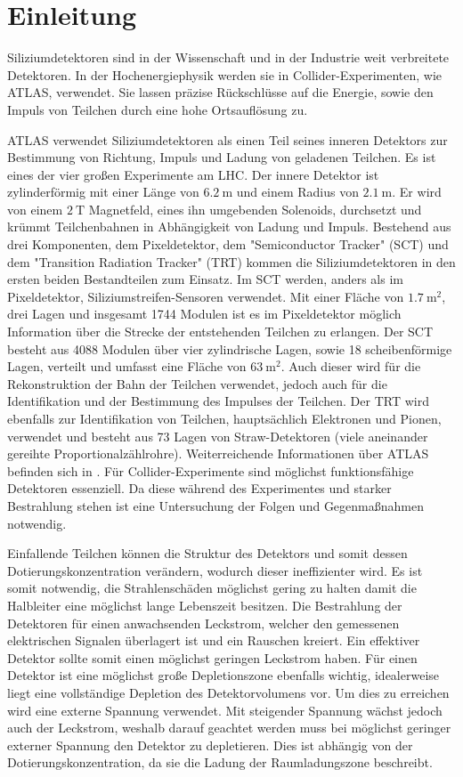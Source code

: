 \chapter{Einleitung}
Siliziumdetektoren sind in der Wissenschaft und in der Industrie weit verbreitete
Detektoren. In der Hochenergiephysik werden sie in Collider-Experimenten, wie ATLAS, verwendet.
Sie  lassen präzise Rückschlüsse auf die Energie, sowie den Impuls von Teilchen durch eine
hohe Ortsauflösung zu.


ATLAS verwendet Siliziumdetektoren als
einen Teil seines inneren Detektors zur Bestimmung von Richtung, Impuls
und Ladung von geladenen Teilchen. Es ist eines der vier großen Experimente am LHC.
Der innere Detektor ist zylinderförmig mit einer Länge von $\SI{6.2}{\meter}$ und
einem Radius von $\SI{2.1}{\meter}$. Er wird von einem $\SI{2}{\tesla}$ Magnetfeld, eines ihn umgebenden Solenoids,
durchsetzt und krümmt Teilchenbahnen in Abhängigkeit von Ladung und Impuls.
Bestehend aus drei Komponenten, dem Pixeldetektor, dem "Semiconductor Tracker" (SCT) und dem "Transition Radiation Tracker" (TRT) kommen  die
Siliziumdetektoren in den ersten beiden Bestandteilen zum Einsatz. Im SCT werden, anders als im Pixeldetektor, Siliziumstreifen-Sensoren verwendet.
Mit einer Fläche von $\SI{1.7}{\meter\squared}$, drei Lagen und insgesamt 1744 Modulen ist es im Pixeldetektor möglich
Information über die Strecke der entstehenden Teilchen zu erlangen. Der SCT besteht aus 4088 Modulen über vier zylindrische Lagen,
sowie 18 scheibenförmige Lagen, verteilt und umfasst eine Fläche von $\SI{63}{\meter\squared}$. Auch dieser wird für
die Rekonstruktion der Bahn der Teilchen verwendet, jedoch auch für die Identifikation und der Bestimmung des Impulses der Teilchen.
Der TRT wird ebenfalls zur Identifikation von Teilchen, hauptsächlich Elektronen und Pionen, verwendet und besteht aus 73 Lagen
von Straw-Detektoren (viele aneinander gereihte Proportionalzählrohre).
Weiterreichende Informationen über ATLAS befinden sich in \cite{ATLAS}.
Für Collider-Experimente sind möglichst funktionsfähige Detektoren essenziell. Da diese während des Experimentes und starker Bestrahlung
stehen ist eine Untersuchung der Folgen und Gegenmaßnahmen notwendig.


Einfallende Teilchen können die
Struktur des Detektors und somit dessen Dotierungskonzentration verändern, wodurch dieser ineffizienter wird.
Es ist somit notwendig, die Strahlenschäden möglichst gering zu halten damit
die Halbleiter eine möglichst lange Lebenszeit besitzen.
Die Bestrahlung der Detektoren für einen anwachsenden Leckstrom, welcher den
gemessenen elektrischen Signalen überlagert ist und ein Rauschen kreiert. Ein
effektiver Detektor sollte somit einen möglichst geringen Leckstrom haben.
Für einen Detektor ist eine möglichst große Depletionszone ebenfalls wichtig, idealerweise
liegt eine vollständige Depletion des Detektorvolumens vor. Um dies zu erreichen wird
eine externe Spannung verwendet. Mit steigender Spannung wächst jedoch auch der Leckstrom, weshalb
darauf geachtet werden muss bei möglichst geringer externer Spannung den Detektor zu depletieren.
Dies ist abhängig von der Dotierungskonzentration, da sie die Ladung der
Raumladungszone beschreibt.

